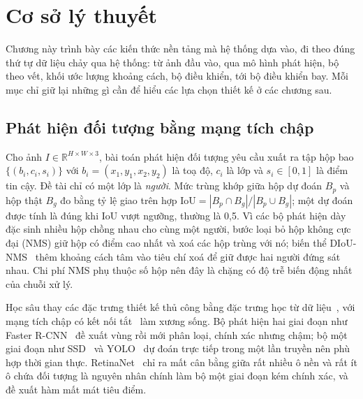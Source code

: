 \renewcommand{\thetable}{\thechapter.\arabic{table}}\renewcommand{\thefigure}{\thechapter.\arabic{figure}}
\chapter{Cơ sở lý thuyết}
\label{chap:lythuyet}

Chương này trình bày các kiến thức nền tảng mà hệ thống dựa vào, đi theo đúng thứ tự dữ liệu chảy qua hệ thống: từ ảnh đầu vào, qua mô hình phát hiện, bộ theo vết, khối ước lượng khoảng cách, bộ điều khiển, tới bộ điều khiển bay. Mỗi mục chỉ giữ lại những gì cần để hiểu các lựa chọn thiết kế ở các chương sau.

\section{Phát hiện đối tượng bằng mạng tích chập}

Cho ảnh $I \in \mathbb{R}^{H \times W \times 3}$, bài toán phát hiện đối tượng yêu cầu xuất ra tập hộp bao $\{(b_i, c_i, s_i)\}$ với $b_i = (x_1, y_1, x_2, y_2)$ là toạ độ, $c_i$ là lớp và $s_i \in [0,1]$ là điểm tin cậy. Đề tài chỉ có một lớp là \textit{người}. Mức trùng khớp giữa hộp dự đoán $B_p$ và hộp thật $B_g$ đo bằng tỷ lệ giao trên hợp $\mathrm{IoU} = |B_p \cap B_g| / |B_p \cup B_g|$; một dự đoán được tính là đúng khi IoU vượt ngưỡng, thường là 0,5. Vì các bộ phát hiện dày đặc sinh nhiều hộp chồng nhau cho cùng một người, bước loại bỏ hộp không cực đại (NMS) giữ hộp có điểm cao nhất và xoá các hộp trùng với nó; biến thể DIoU-NMS~\cite{zheng2020diou} thêm khoảng cách tâm vào tiêu chí xoá để giữ được hai người đứng sát nhau. Chi phí NMS phụ thuộc số hộp nên đây là chặng có độ trễ biến động nhất của chuỗi xử lý.

Học sâu thay các đặc trưng thiết kế thủ công bằng đặc trưng học từ dữ liệu~\cite{lecun2015deep,goodfellow2016dl}, với mạng tích chập có kết nối tắt~\cite{he2016resnet} làm xương sống. Bộ phát hiện hai giai đoạn như Faster R-CNN~\cite{ren2017faster} đề xuất vùng rồi mới phân loại, chính xác nhưng chậm; bộ một giai đoạn như SSD~\cite{liu2016ssd} và YOLO~\cite{redmon2016yolo} dự đoán trực tiếp trong một lần truyền nên phù hợp thời gian thực. RetinaNet~\cite{lin2017focal} chỉ ra mất cân bằng giữa rất nhiều ô nền và rất ít ô chứa đối tượng là nguyên nhân chính làm bộ một giai đoạn kém chính xác, và đề xuất hàm mất mát tiêu điểm.

